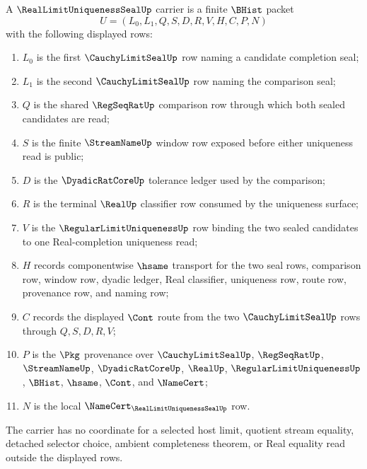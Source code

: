 \begin{definition}
\label{def:real-limit-uniqueness-seal-carrier}
A $\RealLimitUniquenessSealUp$ carrier is a finite $\BHist$ packet
$$
U=(L_0,L_1,Q,S,D,R,V,H,C,P,N)
$$
with the following displayed rows:
\begin{enumerate}
\item $L_0$ is the first $\CauchyLimitSealUp$ row naming a candidate completion seal;
\item $L_1$ is the second $\CauchyLimitSealUp$ row naming the comparison seal;
\item $Q$ is the shared $\RegSeqRatUp$ comparison row through which both sealed candidates are read;
\item $S$ is the finite $\StreamNameUp$ window row exposed before either uniqueness read is public;
\item $D$ is the $\DyadicRatCoreUp$ tolerance ledger used by the comparison;
\item $R$ is the terminal $\RealUp$ classifier row consumed by the uniqueness surface;
\item $V$ is the $\RegularLimitUniquenessUp$ row binding the two sealed candidates to one Real-completion uniqueness read;
\item $H$ records componentwise $\hsame$ transport for the two seal rows, comparison row, window row, dyadic ledger, Real classifier, uniqueness row, route row, provenance row, and naming row;
\item $C$ records the displayed $\Cont$ route from the two $\CauchyLimitSealUp$ rows through $Q,S,D,R,V$;
\item $P$ is the $\Pkg$ provenance over $\CauchyLimitSealUp$, $\RegSeqRatUp$, $\StreamNameUp$, $\DyadicRatCoreUp$, $\RealUp$, $\RegularLimitUniquenessUp$, $\BHist$, $\hsame$, $\Cont$, and $\NameCert$;
\item $N$ is the local $\NameCert_{\RealLimitUniquenessSealUp}$ row.
\end{enumerate}
The carrier has no coordinate for a selected host limit, quotient stream equality, detached selector choice, ambient completeness theorem, or Real equality read outside the displayed rows.
\end{definition}

